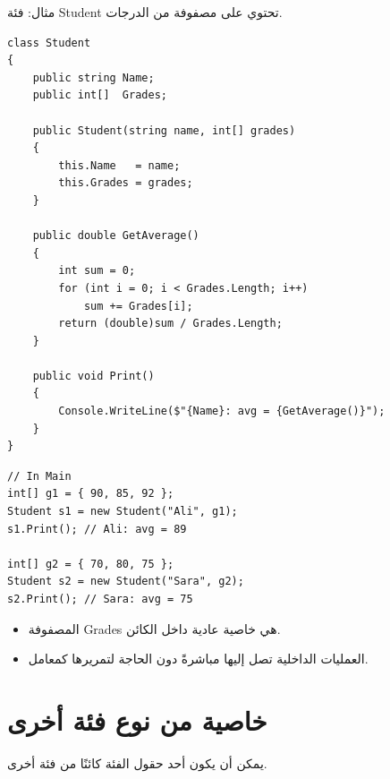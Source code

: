\documentclass[14pt]{extarticle}
\begin{document}
\begin{boxNote}
مثال: فئة \textenglish{Student} تحتوي على مصفوفة من الدرجات.
\end{boxNote}

\begin{boxExample}
\begin{english}
\begin{verbatim}
class Student
{
    public string Name;
    public int[]  Grades;

    public Student(string name, int[] grades)
    {
        this.Name   = name;
        this.Grades = grades;
    }

    public double GetAverage()
    {
        int sum = 0;
        for (int i = 0; i < Grades.Length; i++)
            sum += Grades[i];
        return (double)sum / Grades.Length;
    }

    public void Print()
    {
        Console.WriteLine($"{Name}: avg = {GetAverage()}");
    }
}
\end{verbatim}
\end{english}
\end{boxExample}

\begin{boxExample}
\begin{english}
\begin{verbatim}
// In Main
int[] g1 = { 90, 85, 92 };
Student s1 = new Student("Ali", g1);
s1.Print(); // Ali: avg = 89

int[] g2 = { 70, 80, 75 };
Student s2 = new Student("Sara", g2);
s2.Print(); // Sara: avg = 75
\end{verbatim}
\end{english}
\end{boxExample}

\begin{itemize}[itemsep=1pt]
    \item المصفوفة \textenglish{Grades} هي خاصية عادية داخل الكائن.
    \item العمليات الداخلية تصل إليها مباشرةً دون الحاجة لتمريرها كمعامل.
\end{itemize}

\clearpage
\section{خاصية من نوع فئة أخرى}

يمكن أن يكون أحد حقول الفئة كائنًا من فئة أخرى.
\end{document}
